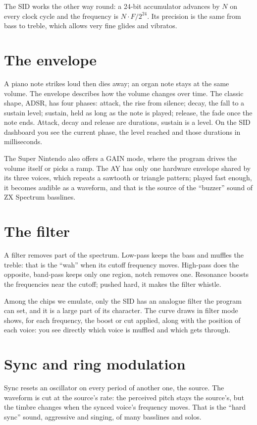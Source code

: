 The SID works the other way round: a 24-bit accumulator advances by $N$ on every clock cycle and the frequency is
$N \cdot F / 2^{24}$. Its precision is the same from bass to treble, which allows very fine glides and vibratos.

\section{The envelope}
A piano note strikes loud then dies away; an organ note stays at the same volume. The envelope describes how the
volume changes over time. The classic shape, ADSR, has four phases: attack, the rise from silence; decay, the fall to
a sustain level; sustain, held as long as the note is played; release, the fade once the note ends. Attack, decay
and release are durations, sustain is a level. On the SID dashboard you see the current phase, the level reached and
those durations in milliseconds.

The Super Nintendo also offers a GAIN mode, where the program drives the volume itself or picks a ramp. The AY has
only one hardware envelope shared by its three voices, which repeats a sawtooth or triangle pattern; played fast
enough, it becomes audible as a waveform, and that is the source of the ``buzzer'' sound of ZX Spectrum basslines.

\section{The filter}
A filter removes part of the spectrum. Low-pass keeps the bass and muffles the treble: that is the ``wah'' when its
cutoff frequency moves. High-pass does the opposite, band-pass keeps only one region, notch removes one. Resonance
boosts the frequencies near the cutoff; pushed hard, it makes the filter whistle.

Among the chips we emulate, only the SID has an analogue filter the program can set, and it is a large part of its
character. The curve \soft draws in filter mode shows, for each frequency, the boost or cut applied, along with the
position of each voice: you see directly which voice is muffled and which gets through.

\section{Sync and ring modulation}
Sync resets an oscillator on every period of another one, the source. The waveform is cut at the source's rate: the
perceived pitch stays the source's, but the timbre changes when the synced voice's frequency moves. That is the
``hard sync'' sound, aggressive and singing, of many basslines and solos.


